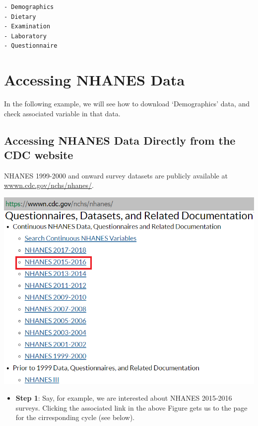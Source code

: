 \documentclass[
]{book}
\providecommand{\tightlist}{%
  \setlength{\itemsep}{0pt}\setlength{\parskip}{0pt}}
\begin{document}
\begin{verbatim}
- Demographics
- Dietary
- Examination
- Laboratory
- Questionnaire
\end{verbatim}

\hypertarget{accessing-nhanes-data}{%
\section{Accessing NHANES Data}\label{accessing-nhanes-data}}

In the following example, we will see how to download `Demographics' data, and check associated variable in that data.

\hypertarget{accessing-nhanes-data-directly-from-the-cdc-website}{%
\subsection{Accessing NHANES Data Directly from the CDC website}\label{accessing-nhanes-data-directly-from-the-cdc-website}}

NHANES 1999-2000 and onward survey datasets are publicly available at \href{https://wwwn.cdc.gov/nchs/nhanes/}{wwwn.cdc.gov/nchs/nhanes/}.

\includegraphics[width=0.65\linewidth]{images/n15}

\begin{itemize}
\tightlist
\item
  \textbf{Step 1}: Say, for example, we are interested about NHANES 2015-2016 surveys. Clicking the associated link in the above Figure gets us to the page for the cirresponding cycle (see below).
\end{itemize}
\end{document}
